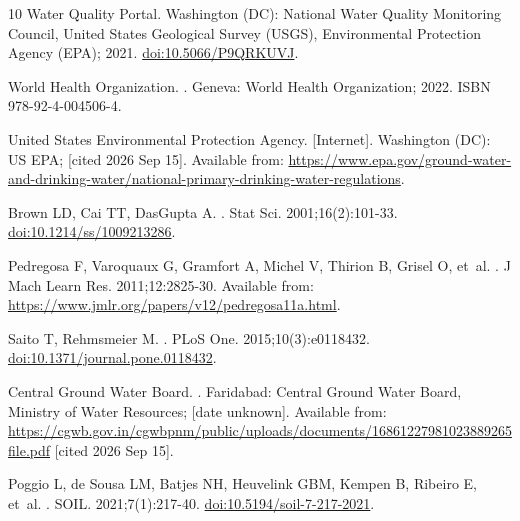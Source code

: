 \documentclass[10pt,letterpaper]{article}
\begin{document}
\begin{thebibliography}{10}
{Water Quality Portal}. Washington (DC): National Water Quality Monitoring
  Council, United States Geological Survey (USGS), Environmental Protection
  Agency (EPA); 2021.
\newblock \href {http://dx.doi.org/10.5066/P9QRKUVJ} {doi:10.5066/P9QRKUVJ}.

{World Health Organization}.
.
\newblock Geneva: World Health Organization; 2022.
\newblock ISBN 978-92-4-004506-4.

{United States Environmental Protection Agency}.
 [Internet]. Washington
  (DC): US EPA; [cited 2026 Sep 15].
\newblock Available from:
  \url{https://www.epa.gov/ground-water-and-drinking-water/national-primary-drinking-water-regulations}.

{Brown} LD, {Cai} TT, {DasGupta} A.
.
\newblock Stat Sci. 2001;16(2):101-33.
\newblock \href {http://dx.doi.org/10.1214/ss/1009213286}
  {doi:10.1214/ss/1009213286}.

{Pedregosa} F, {Varoquaux} G, {Gramfort} A, {Michel} V, {Thirion} B, {Grisel}
  O, et~al.
.
\newblock J Mach Learn Res. 2011;12:2825-30.
\newblock Available from:
  \url{https://www.jmlr.org/papers/v12/pedregosa11a.html}.

{Saito} T, {Rehmsmeier} M.
.
\newblock PLoS One. 2015;10(3):e0118432.
\newblock \href {http://dx.doi.org/10.1371/journal.pone.0118432}
  {doi:10.1371/journal.pone.0118432}.

{Central Ground Water Board}.
.
\newblock Faridabad: Central Ground Water Board, Ministry of Water Resources;
  [date unknown].
\newblock Available from:
  \url{https://cgwb.gov.in/cgwbpnm/public/uploads/documents/16861227981023889265file.pdf}
  [cited 2026 Sep 15].

{Poggio} L, {de Sousa} LM, {Batjes} NH, {Heuvelink} GBM, {Kempen} B, {Ribeiro}
  E, et~al.
.
\newblock SOIL. 2021;7(1):217-40.
\newblock \href {http://dx.doi.org/10.5194/soil-7-217-2021}
  {doi:10.5194/soil-7-217-2021}.


\end{thebibliography}
\end{document}
